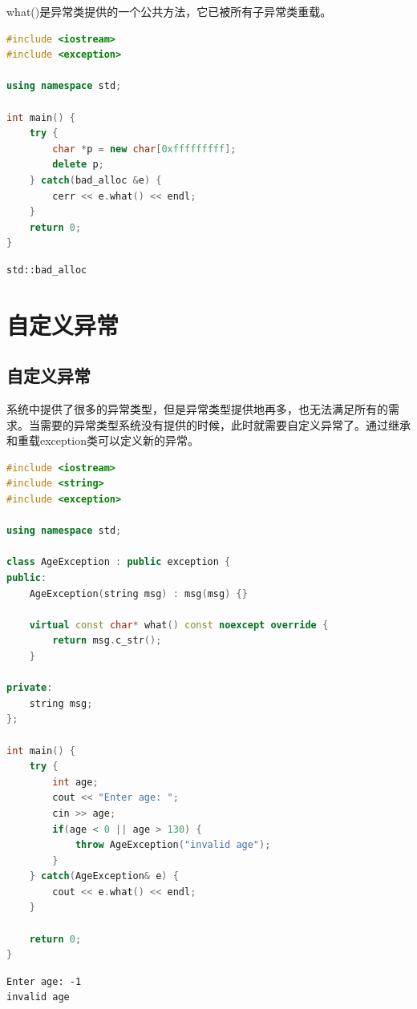 what()是异常类提供的一个公共方法，它已被所有子异常类重载。\\


\begin{lstlisting}[language=C++]
#include <iostream>
#include <exception>

using namespace std;

int main() {
    try {
        char *p = new char[0xfffffffff];
        delete p;
    } catch(bad_alloc &e) {
        cerr << e.what() << endl;
    }
    return 0;
}
\end{lstlisting}

\begin{tcolorbox}
	\begin{verbatim}
std::bad_alloc
	\end{verbatim}
\end{tcolorbox}

\newpage

\section{自定义异常}

\subsection{自定义异常}

系统中提供了很多的异常类型，但是异常类型提供地再多，也无法满足所有的需求。当需要的异常类型系统没有提供的时候，此时就需要自定义异常了。通过继承和重载exception类可以定义新的异常。\\


\begin{lstlisting}[language=C++]
#include <iostream>
#include <string>
#include <exception>

using namespace std;

class AgeException : public exception {
public:
    AgeException(string msg) : msg(msg) {}

    virtual const char* what() const noexcept override {
        return msg.c_str();
    }

private:
    string msg;
};

int main() {
    try {
        int age;
        cout << "Enter age: ";
        cin >> age;
        if(age < 0 || age > 130) {
            throw AgeException("invalid age");
        }
    } catch(AgeException& e) {
        cout << e.what() << endl;
    }

    return 0;
}
\end{lstlisting}

\begin{tcolorbox}
	\begin{verbatim}
Enter age: -1
invalid age
	\end{verbatim}
\end{tcolorbox}

\newpage